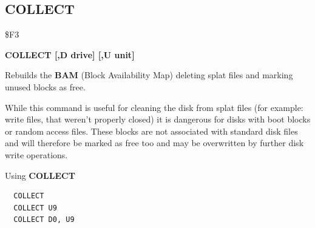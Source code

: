 \subsection{COLLECT}
\begin{description}[leftmargin=2cm,style=nextline]
\item [Token:] \$F3
\item [Format:] {\bf COLLECT [,D drive] [,U unit] }
\item [Usage:]
   Rebuilds the {\bf BAM}
   (Block Availability Map) deleting splat files and marking
   unused blocks as free.

   \drivedefinition

   \unitdefinition

\item [Remarks:]
   While this command is useful for cleaning the disk from
   splat files (for example: write files, that weren't properly closed)
   it is dangerous for disks with boot blocks or random access files.
   These blocks are not associated with standard disk files
   and will therefore be marked as free too and may be overwritten
   by further disk write operations.

\item [Example:] Using {\bf COLLECT}
\begin{tcolorbox}[colback=black,coltext=white]
\verbatimfont{\codefont}
\begin{verbatim}
  COLLECT
  COLLECT U9
  COLLECT D0, U9
\end{verbatim}
\end{tcolorbox}
\end{description}


\newpage

